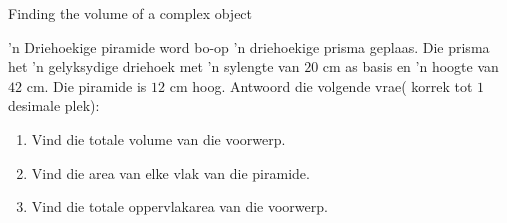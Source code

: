 \begin{wex}{Finding the volume of a complex object}
 {'n Driehoekige piramide word bo-op ’n driehoekige
prisma geplaas. Die prisma het ’n gelyksydige driehoek met ’n sylengte
van $20$ cm as basis en ’n hoogte van  $42$ cm. Die piramide is $12$ cm hoog. Antwoord die volgende vrae( korrek tot $1$ desimale plek):

\begin{enumerate}[noitemsep, label=\textbf{\arabic*}. ] 
\item Vind die totale volume van die voorwerp.
\item Vind die area van elke vlak van die piramide.
\item Vind die totale oppervlakarea van die voorwerp.
\end{enumerate}

\begin{center}


\end{center}}
\end{wex}
